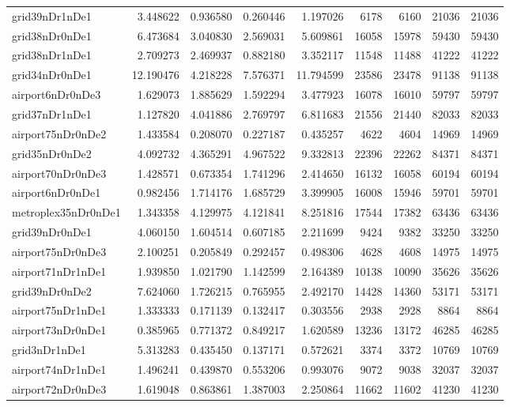 \begin{longtable}{|l|r|r|r|r|r|r|r|r|}
grid39nDr1nDe1 & 3.448622 & 0.936580 & 0.260446 & 1.197026 & 6178 & 6160 & 21036 & 21036 \\
grid38nDr0nDe1 & 6.473684 & 3.040830 & 2.569031 & 5.609861 & 16058 & 15978 & 59430 & 59430 \\
grid38nDr1nDe1 & 2.709273 & 2.469937 & 0.882180 & 3.352117 & 11548 & 11488 & 41222 & 41222 \\
grid34nDr0nDe1 & 12.190476 & 4.218228 & 7.576371 & 11.794599 & 23586 & 23478 & 91138 & 91138 \\
airport6nDr0nDe3 & 1.629073 & 1.885629 & 1.592294 & 3.477923 & 16078 & 16010 & 59797 & 59797 \\
grid37nDr1nDe1 & 1.127820 & 4.041886 & 2.769797 & 6.811683 & 21556 & 21440 & 82033 & 82033 \\
airport75nDr0nDe2 & 1.433584 & 0.208070 & 0.227187 & 0.435257 & 4622 & 4604 & 14969 & 14969 \\
grid35nDr0nDe2 & 4.092732 & 4.365291 & 4.967522 & 9.332813 & 22396 & 22262 & 84371 & 84371 \\
airport70nDr0nDe3 & 1.428571 & 0.673354 & 1.741296 & 2.414650 & 16132 & 16058 & 60194 & 60194 \\
airport6nDr0nDe1 & 0.982456 & 1.714176 & 1.685729 & 3.399905 & 16008 & 15946 & 59701 & 59701 \\
metroplex35nDr0nDe1 & 1.343358 & 4.129975 & 4.121841 & 8.251816 & 17544 & 17382 & 63436 & 63436 \\
grid39nDr0nDe1 & 4.060150 & 1.604514 & 0.607185 & 2.211699 & 9424 & 9382 & 33250 & 33250 \\
airport75nDr0nDe3 & 2.100251 & 0.205849 & 0.292457 & 0.498306 & 4628 & 4608 & 14975 & 14975 \\
airport71nDr1nDe1 & 1.939850 & 1.021790 & 1.142599 & 2.164389 & 10138 & 10090 & 35626 & 35626 \\
grid39nDr0nDe2 & 7.624060 & 1.726215 & 0.765955 & 2.492170 & 14428 & 14360 & 53171 & 53171 \\
airport75nDr1nDe1 & 1.333333 & 0.171139 & 0.132417 & 0.303556 & 2938 & 2928 & 8864 & 8864 \\
airport73nDr0nDe1 & 0.385965 & 0.771372 & 0.849217 & 1.620589 & 13236 & 13172 & 46285 & 46285 \\
grid3nDr1nDe1 & 5.313283 & 0.435450 & 0.137171 & 0.572621 & 3374 & 3372 & 10769 & 10769 \\
airport74nDr1nDe1 & 1.496241 & 0.439870 & 0.553206 & 0.993076 & 9072 & 9038 & 32037 & 32037 \\
airport72nDr0nDe3 & 1.619048 & 0.863861 & 1.387003 & 2.250864 & 11662 & 11602 & 41230 & 41230 \\

\end{longtable}

